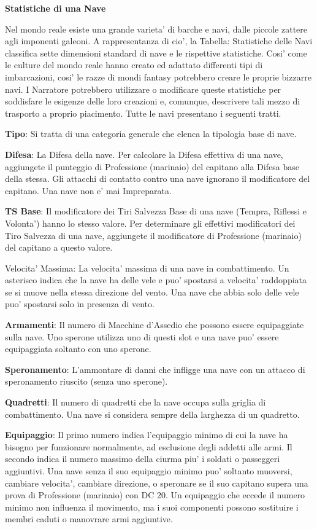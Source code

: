\documentclass[a4paper,11pt,twoside,openany]{book}
\begin{document}
{\textbf{Statistiche di una Nave}

Nel mondo reale esiste una grande varieta' di barche e navi, dalle piccole zattere agli imponenti galeoni. A rappresentanza di cio', la Tabella: Statistiche delle Navi classifica sette dimensioni standard di nave e le rispettive statistiche. Cosi' come le culture del mondo reale hanno creato ed adattato differenti tipi di imbarcazioni, cosi' le razze di mondi fantasy potrebbero creare le proprie bizzarre navi.
I Narratore potrebbero utilizzare o modificare queste statistiche per soddisfare le esigenze delle loro creazioni e, comunque, descrivere tali mezzo di trasporto a proprio piacimento. Tutte le navi presentano i seguenti tratti.

\textbf{Tipo}: Si tratta di una categoria generale che elenca la tipologia base di nave.

\textbf{Difesa}: La Difesa della nave. Per calcolare la Difesa effettiva di una nave, aggiungete il punteggio di Professione (marinaio) del capitano alla Difesa base della stessa. Gli attacchi di contatto contro una nave ignorano il modificatore del capitano. Una nave non e' mai Impreparata.

\textbf{TS Base}: Il modificatore dei Tiri Salvezza Base di una nave (Tempra, Riflessi e Volonta') hanno lo stesso valore. Per determinare gli effettivi modificatori dei Tiro Salvezza di una nave, aggiungete il modificatore di Professione (marinaio) del capitano a questo valore.

Velocita' Massima: La velocita' massima di una nave in combattimento. Un asterisco indica che la nave ha delle vele e puo' spostarsi a velocita' raddoppiata se si muove nella stessa direzione del vento. Una nave che abbia solo delle vele puo' spostarsi solo in presenza di vento.

\textbf{Armamenti}: Il numero di Macchine d'Assedio che possono essere equipaggiate sulla nave. Uno sperone utilizza uno di questi slot e una nave puo' essere equipaggiata soltanto con uno sperone.

\textbf{Speronamento}: L'ammontare di danni che infligge una nave con un attacco di speronamento riuscito (senza uno sperone).

\textbf{Quadretti}: Il numero di quadretti che la nave occupa sulla griglia di combattimento. Una nave si considera sempre della larghezza di un quadretto.

\textbf{Equipaggio}: Il primo numero indica l'equipaggio minimo di cui la nave ha bisogno per funzionare normalmente, ad esclusione degli addetti alle armi. Il secondo indica il numero massimo della ciurma piu' i soldati o passeggeri aggiuntivi. Una nave senza il suo equipaggio minimo puo' soltanto muoversi, cambiare velocita', cambiare direzione, o speronare se il suo capitano supera una prova di Professione (marinaio) con DC 20.
Un equipaggio che eccede il numero minimo non influenza il movimento, ma i suoi componenti possono sostituire i membri caduti o manovrare armi aggiuntive.

}
\end{document}
